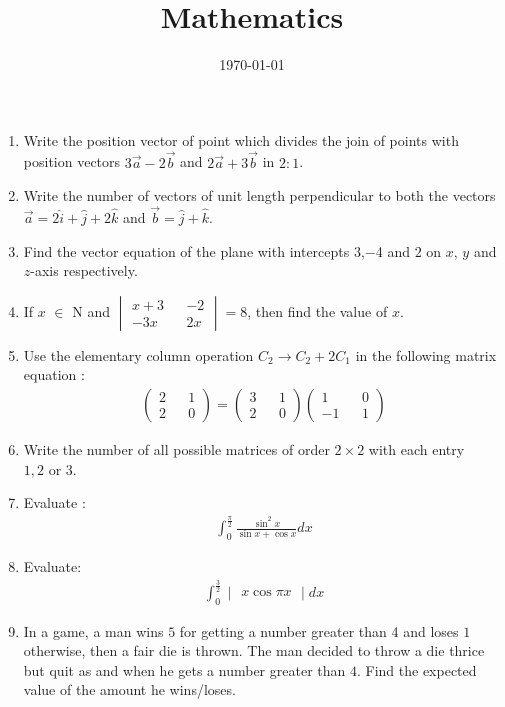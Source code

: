 \documentclass[12pt,-letter paper]{article}
\title{Mathematics}
\date{\today}
\theoremstyle{remark}
\newcommand{\myvec}[1]{\ensuremath{\begin{pmatrix}#1\end{pmatrix}}}
\newcommand{\mydet}[1]{\ensuremath{\begin{vmatrix}#1\end{vmatrix}}}
\begin{document}

\begin{enumerate}
    \item Write the position vector of point which divides the join of points with position vectors  ${3\overrightarrow{a}-2\overrightarrow{b}}$ and ${2\overrightarrow{a}+3\overrightarrow{b}}$ in $2:1$.
    \item Write the number of vectors of unit length perpendicular to both the vectors $\overrightarrow{a} = 2\hat{i} + \hat{j}+2\hat{k}$ and $\overrightarrow{b}=\hat{j}+\hat{k}$.
    \item Find the vector equation of the plane with intercepts $3$,$-$4 and $2$ on $x$, $y$ and $z$-axis respectively.
    
    \item If $x$ $\in $ N and $\mydet{x+3 && -2 \\ -3x && 2x} = 8$, then find the value of $x$.
    \item Use the elementary column operation $C_2 \rightarrow C_2 + 2C_1$ in the following matrix equation : 
    \begin{align*}
        \myvec{2 && 1 \\2&& 0} = \myvec{3 && 1 \\ 2 && 0} \myvec{1 && 0 \\-1 && 1}
    \end{align*}
    \item Write the number of all possible matrices of order $2\times2$  with each entry $1,2 \text{ or } 3$.


    \item Evaluate :
    \begin{align*}
        \int_{0}^\frac{\pi}{2}{\frac{\sin^2x}{\sin x+ \cos x}}{dx}
    \end{align*}
    \item Evaluate:
    \begin{align*}
        \int_{0}^\frac{3}{2}{\mydet{x \cos \pi x}}dx
    \end{align*}
    \item In a game, a man wins \rupee $5$ for getting a number greater than 4 and loses \rupee $1$ otherwise, then a fair die is thrown. The man decided to throw a die thrice but  quit as and when he gets a number greater than $4$. Find the expected value of the amount he wins/loses.
    

\end{enumerate}
\end{document}
